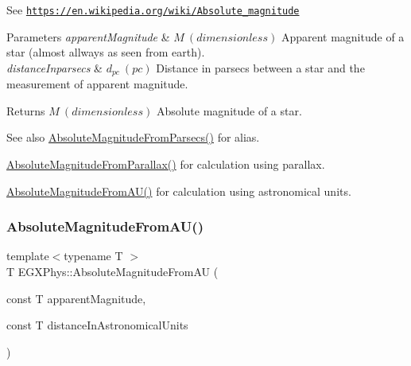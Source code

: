 See \href{https://en.wikipedia.org/wiki/Absolute_magnitude}{\tt https\+://en.\+wikipedia.\+org/wiki/\+Absolute\+\_\+magnitude}


\begin{DoxyParams}{Parameters}
{\em apparent\+Magnitude} & $M\ (dimensionless)$ Apparent magnitude of a star (almost allways as seen from earth). \\
\hline
{\em distance\+Inparsecs} & $d_{pc}\ (pc)$ Distance in parsecs between a star and the measurement of apparent magnitude. \\
\hline
\end{DoxyParams}
\begin{DoxyReturn}{Returns}
$M\ (dimensionless)$ Absolute magnitude of a star. 
\end{DoxyReturn}
\begin{DoxySeeAlso}{See also}
\mbox{\hyperlink{group___e_g_x_phys-_astrophysics-_absolute_magnitude_ga6eb3d93ce8d6ff1e0cc288059225ff9a}{Absolute\+Magnitude\+From\+Parsecs()}} for alias. 

\mbox{\hyperlink{group___e_g_x_phys-_astrophysics-_absolute_magnitude_ga057faec7c22e76e31ad65bf2f98e0d58}{Absolute\+Magnitude\+From\+Parallax()}} for calculation using parallax. 

\mbox{\hyperlink{group___e_g_x_phys-_astrophysics-_absolute_magnitude_gab25029a422f98bc7f8cea59abce3860e}{Absolute\+Magnitude\+From\+A\+U()}} for calculation using astronomical units. 
\end{DoxySeeAlso}
\mbox{\label{group___e_g_x_phys-_astrophysics-_absolute_magnitude_gab25029a422f98bc7f8cea59abce3860e}} 
\subsubsection{\texorpdfstring{Absolute\+Magnitude\+From\+A\+U()}{AbsoluteMagnitudeFromAU()}}
{\footnotesize\ttfamily template$<$typename T $>$ \\
T E\+G\+X\+Phys\+::\+Absolute\+Magnitude\+From\+AU (\begin{DoxyParamCaption}\item[{const T}]{apparent\+Magnitude,  }\item[{const T}]{distance\+In\+Astronomical\+Units }\end{DoxyParamCaption})}



